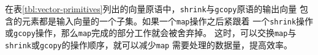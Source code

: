 在表\ref{tbl:vector-primitives}列出的向量原语中，\texttt{shrink}与\texttt{gcopy}原语的输出向量
包含的元素都是输入向量的一个子集。如果一个\texttt{map}操作之后紧跟着
一个\texttt{shrink}操作或\texttt{gcopy}操作，那么\texttt{map}完成的部分工作就会被舍弃掉。
这时，可以交换\texttt{map}与\texttt{shrink}或\texttt{gcopy}的操作顺序，就可以减少\texttt{map}
需要处理的数据量，提高效率。


